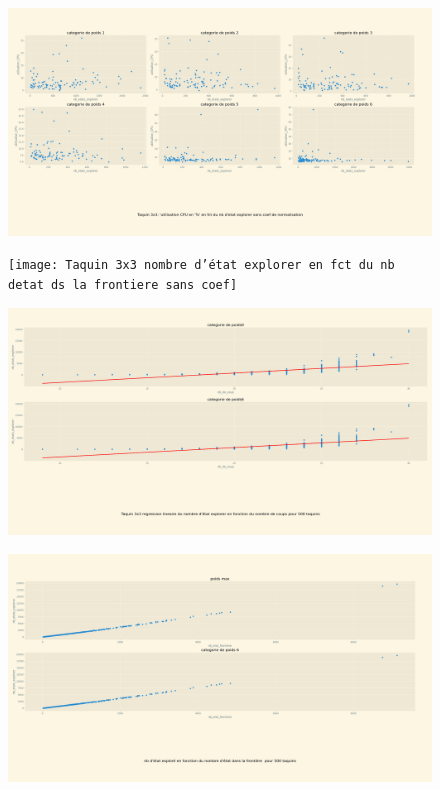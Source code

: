 \documentclass[a4paper, 12pt]{article}
\begin{document}
\begin{figure}[H]
    \centering
    \includegraphics[width=\textwidth]{Taquin 3x3 utilisation CPU en fct du nb d'etat explorer sans coef de normalisation}
\end{figure}

\begin{figure}[H]
    \centering
    \texttt{[image: Taquin 3x3 nombre d'état explorer en fct du nb detat ds la frontiere sans coef]}
\end{figure}

\begin{figure}[H]
    \centering
    \includegraphics[width=\textwidth]{Taquin 3x3 nombre d'etat explorer en fct du nb de coups}
\end{figure}

\begin{figure}[H]
    \centering
    \includegraphics[width=\textwidth]{Taquin 3x3 nombre d'etat explorer en fct du nb de detat dans la frontiere}
\end{figure}
\end{document}
